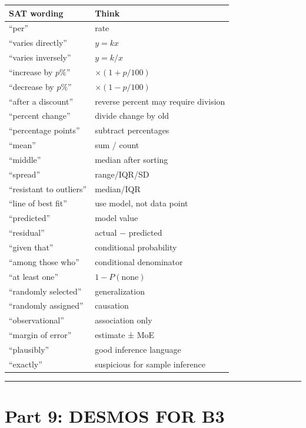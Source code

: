 \documentclass[
]{article}
\newcounter{none} %
\begin{document}
{\def\LTcaptype{none} %
\begin{longtable}[]{@{}ll@{}}
\toprule\noalign{}
SAT wording & Think \\
\midrule\noalign{}
\endhead
\bottomrule\noalign{}
\endlastfoot
``per'' & rate \\
``varies directly'' & \(y=kx\) \\
``varies inversely'' & \(y=k/x\) \\
``increase by \(p\%\)'' & \(\times(1+p/100)\) \\
``decrease by \(p\%\)'' & \(\times(1-p/100)\) \\
``after a discount'' & reverse percent may require division \\
``percent change'' & divide change by old \\
``percentage points'' & subtract percentages \\
``mean'' & sum / count \\
``middle'' & median after sorting \\
``spread'' & range/IQR/SD \\
``resistant to outliers'' & median/IQR \\
``line of best fit'' & use model, not data point \\
``predicted'' & model value \\
``residual'' & actual − predicted \\
``given that'' & conditional probability \\
``among those who'' & conditional denominator \\
``at least one'' & \(1-P(\text{none})\) \\
``randomly selected'' & generalization \\
``randomly assigned'' & causation \\
``observational'' & association only \\
``margin of error'' & estimate ± MoE \\
``plausibly'' & good inference language \\
``exactly'' & suspicious for sample inference \\
\end{longtable}
}

\begin{center}\rule{0.5\linewidth}{0.5pt}\end{center}

\section{Part 9: DESMOS FOR B3}\label{part-9-desmos-for-b3}
\end{document}
